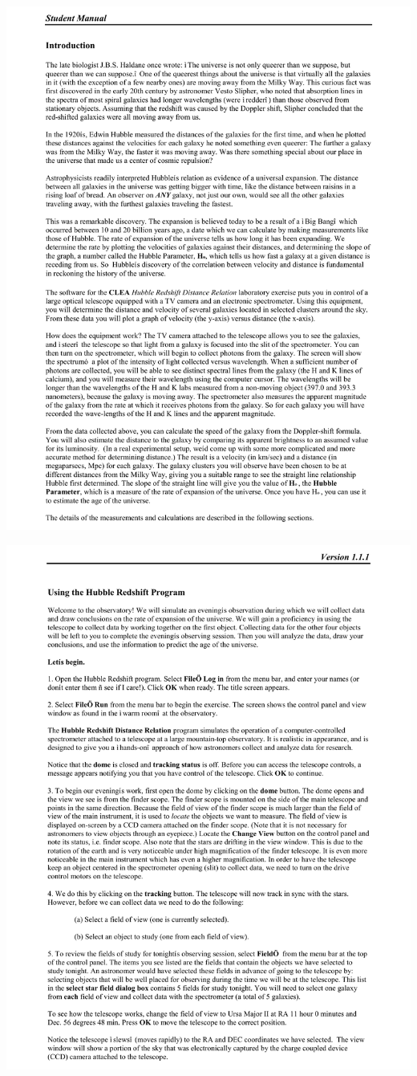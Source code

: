 \includegraphics[width=\textwidth]{hubble/hubble2.pdf}
\vfil\eject

\includegraphics[width=\textwidth]{hubble/hubble3.pdf}
\vfil\eject

